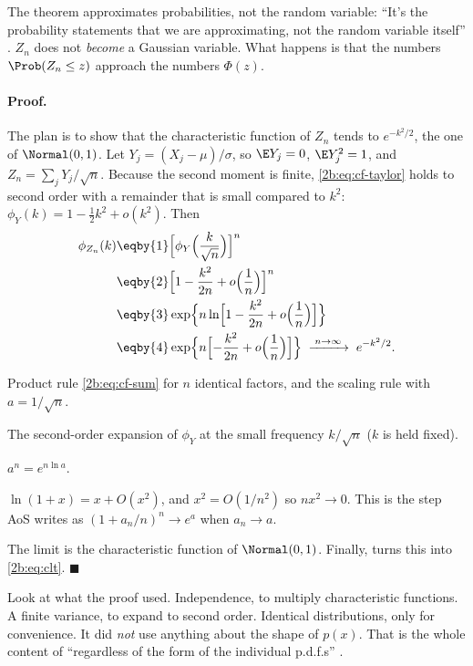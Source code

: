 The theorem approximates probabilities, not the random variable: ``It's the probability statements that we are approximating, not the random variable itself'' . $Z_n$ does not \emph{become} a Gaussian variable. What happens is that the numbers $\Prob(Z_n\le z)$ approach the numbers $\Phi(z)$.

\paragraph{Proof.} The plan is to show that the characteristic function of $Z_n$ tends to $e^{-k^2/2}$, the one of $\Normal(0,1)$. Let $Y_j=(X_j-\mu)/\sigma$, so $\E Y_j=0$, $\E Y_j^2=1$, and $Z_n=\sum_jY_j/\sqrt n$. Because the second moment is finite, \eqref{2b:eq:cf-taylor} holds to second order with a remainder that is small compared to $k^2$: $\phi_Y(k)=1-\tfrac12k^2+o(k^2)$. Then
\begin{align}
  \phi_{Z_n}(k)
  &\eqby{1} \Bigl[\phi_Y\Bigl(\frac{k}{\sqrt n}\Bigr)\Bigr]^n \nonumber\\
  &\eqby{2} \Bigl[1-\frac{k^2}{2n}+o\Bigl(\frac1n\Bigr)\Bigr]^n \nonumber\\
  &\eqby{3} \exp\Bigl\{n\ln\Bigl[1-\frac{k^2}{2n}+o\Bigl(\frac1n\Bigr)\Bigr]\Bigr\} \nonumber\\
  &\eqby{4} \exp\Bigl\{n\Bigl[-\frac{k^2}{2n}+o\Bigl(\frac1n\Bigr)\Bigr]\Bigr\}
  \;\xrightarrow{\;n\to\infty\;}\; e^{-k^2/2} .
  \label{2b:eq:clt-proof}
\end{align}
\begin{explain}
  \item Product rule \eqref{2b:eq:cf-sum} for $n$ identical factors, and the scaling rule with $a=1/\sqrt n$.
  \item The second-order expansion of $\phi_Y$ at the small frequency $k/\sqrt n$ ($k$ is held fixed).
  \item $a^n=e^{n\ln a}$.
  \item $\ln(1+x)=x+O(x^2)$, and $x^2=O(1/n^2)$ so $nx^2\to0$. This is the step AoS writes as $(1+a_n/n)^n\to e^a$ when $a_n\to a$.
\end{explain}
The limit is the characteristic function of $\Normal(0,1)$. Finally,   turns this into \eqref{2b:eq:clt}. \qquad$\blacksquare$

Look at what the proof used. Independence, to multiply characteristic functions. A finite variance, to expand to second order. Identical distributions, only for convenience. It did \emph{not} use anything about the shape of $p(x)$. That is the whole content of ``regardless of the form of the individual p.d.f.s'' .

